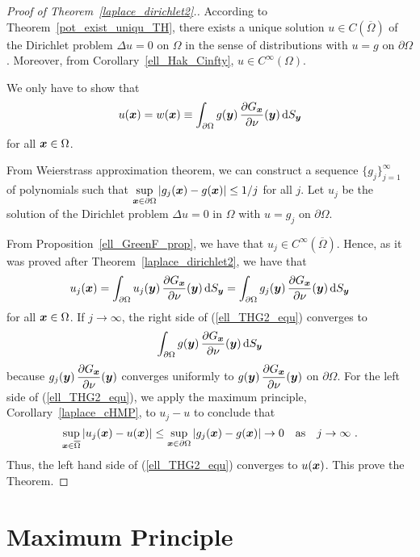 \begin{proof}[Proof of Theorem~\ref{laplace_dirichlet2}.]
According to Theorem~\ref{pot_exist_uniqu_TH}, there exists a unique
solution $u \in C(\overline{\Omega})$ of the Dirichlet problem
$\Delta u = 0$ on $\Omega$ in the sense of distributions with $u=g$
on $\partial \Omega$.
Moreover, from Corollary~\ref{ell_Hak_Cinfty},
$\displaystyle u \in C^\infty(\Omega)$.

We only have to show that
\[
u({\bm{x}}) = w({\bm{x}}) \equiv \int_{\partial \Omega} g({\bm{y}})\,
\frac{\partial{G_{{\bm{x}}}}}{\partial \nu}({\bm{y}})\,\mathrm{d}{S}_{{\bm{y}}}
\]
for all ${\bm{x}} \in \Omega$.

From Weierstrass approximation theorem, we can construct a sequence
$\displaystyle \{ g_j\}_{j=1}^\infty$ of polynomials such that
$\displaystyle \sup_{{\bm{x}} \in \partial \Omega}
|g_j({\bm{x}}) - g({\bm{x}})| \leq 1/j$ for all $j$.
Let $u_j$ be the solution of the Dirichlet problem
$\Delta u = 0$ in $\Omega$ with $u=g_j$ on $\partial \Omega$.

From Proposition~\ref{ell_GreenF_prop}, we have that
$\displaystyle u_j \in C^\infty(\overline{\Omega})$.  Hence, as it was
proved after Theorem~\ref{laplace_dirichlet2}, we have that
\begin{equation} \label{ell_THG2_equ}
u_j({\bm{x}}) = \int_{\partial \Omega} u_j({\bm{y}})\,
\frac{\partial{G_{{\bm{x}}}}}{\partial \nu}({\bm{y}})\,\mathrm{d}{S}_{{\bm{y}}}
= \int_{\partial \Omega} g_j({\bm{y}})\,
\frac{\partial{G_{{\bm{x}}}}}{\partial \nu}({\bm{y}})\,\mathrm{d}{S}_{{\bm{y}}}
\end{equation}
for all $\displaystyle {\bm{x}} \in \Omega$.
If $j \rightarrow \infty$, the right side of (\ref{ell_THG2_equ})
converges to
\[
\int_{\partial \Omega} g({\bm{y}})\,
\frac{\partial{G_{{\bm{x}}}}}{\partial \nu}({\bm{y}})\,\mathrm{d}{S}_{{\bm{y}}}
\]
because $\displaystyle g_j({\bm{y}})\,\frac{\partial{G_{{\bm{x}}}}}{\partial \nu}({\bm{y}})$
converges uniformly to $\displaystyle g({\bm{y}})\,
\frac{\partial{G_{{\bm{x}}}}}{\partial \nu}({\bm{y}})$ on $\partial \Omega$.
For the left side of (\ref{ell_THG2_equ}), we apply the maximum
principle, Corollary~\ref{laplace_cHMP}, to $u_j-u$ to conclude that
\[
\sup_{{\bm{x}}\in \overline{\Omega}} |u_j({\bm{x}}) - u({\bm{x}})| \leq
\sup_{{\bm{x}}\in \partial \Omega} |g_j({\bm{x}}) - g({\bm{x}})|
\rightarrow 0
\quad \text{as} \quad j \rightarrow \infty \ .
\]
Thus, the left hand side of (\ref{ell_THG2_equ}) converges to
$u({\bm{x}})$.  This prove the Theorem.
\end{proof}

\section{Maximum Principle}

